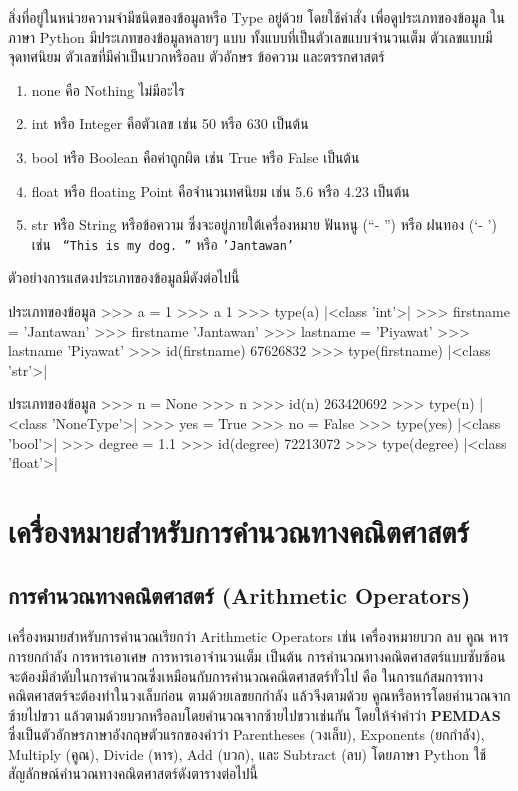 สิ่งที่อยู่ในหน่วยความจำมีชนิดของข้อมูลหรือ Type อยู่ด้วย โดยใช้คำสั่ง  เพื่อดูประเภทของข้อมูล ในภาษา Python มีประเภทของข้อมูลหลายๆ แบบ \cite{Luc15} ทั้งแบบที่เป็นตัวเลขแบบจำนวนเต็ม ตัวเลขแบบมีจุดทศนิยม ตัวเลขที่มีค่าเป็นบวกหรือลบ ตัวอักษร ข้อความ และตรรกศาสตร์

\begin{enumerate}[noitemsep]
\item none คือ Nothing ไม่มีอะไร 
\item int หรือ Integer คือตัวเลข เช่น 50 หรือ 630 เป็นต้น
\item bool หรือ Boolean คือค่าถูกผิด เช่น True หรือ False เป็นต้น
\item float หรือ floating Point คือจำนวนทศนิยม เช่น 5.6 หรือ 4.23 เป็นต้น
\item str หรือ String หรือข้อความ ซึ่งจะอยู่ภายใต้เครื่องหมาย ฟันหนู (\textquotedblleft - \textquotedblright) หรือ ฝนทอง  (\textquoteleft - \textquoteright)   เช่น \texttt{ \textquotedblleft This is my dog. \textquotedblright }  หรือ \texttt{'Jantawan'}
\end{enumerate}

ตัวอย่างการแสดงประเภทของข้อมูลมีดังต่อไปนี้

\begin{codelist}{ประเภทของข้อมูล}{}
>>> a = 1
>>> a
1
>>> type(a)
|<class \rq{}int\rq{}>|
>>> firstname = 'Jantawan'
>>> firstname
'Jantawan'
>>> lastname = 'Piyawat'
>>> lastname
'Piyawat'
>>> id(firstname)
67626832
>>> type(firstname)
|<class \rq{}str\rq{}>|
\end{codelist}


\begin{codelist}{ประเภทของข้อมูล}{}
>>> n = None
>>> n
>>> id(n)
263420692
>>> type(n)
|<class \rq{}NoneType\rq{}>|
>>> yes = True
>>> no = False
>>> type(yes)
|<class \rq{}bool\rq{}>|
>>> degree = 1.1
>>> id(degree)
72213072
>>> type(degree)
|<class \rq{}float\rq{}>|
\end{codelist}


\section{เครื่องหมายสำหรับการคำนวณทางคณิตศาสตร์}
\subsection{การคำนวณทางคณิตศาสตร์ (Arithmetic Operators)}

เครื่องหมายสำหรับการคำนวณเรียกว่า  Arithmetic Operators เช่น เครื่องหมายบวก ลบ คูณ หาร การยกกำลัง การหารเอาเศษ การหารเอาจำนวนเต็ม เป็นต้น การคำนวณทางคณิตศาสตร์แบบซับซ้อนจะต้องมีลำดับในการคำนวณซึ่งเหมือนกับการคำนวณคณิตศาสตร์ทั่วไป คือ ในการแก้สมการทางคณิตศาสตร์จะต้องทำในวงเล็บก่อน ตามด้วยเลขยกกำลัง แล้วจึงตามด้วย คูณหรือหารโดยคำนวณจากซ้ายไปขวา แล้วตามด้วยบวกหรือลบโดยคำนวณจากซ้ายไปขวาเช่นกัน โดยให้จำคำว่า \textbf{PEMDAS} ซึ่งเป็นตัวอักษรภาษาอังกฤษตัวแรกของคำว่า Parentheses (วงเล็บ), Exponents (ยกกำลัง), Multiply (คูณ), Divide (หาร), Add (บวก), และ Subtract (ลบ) โดยภาษา Python  ใช้สัญลักษณ์คำนวณทางคณิตศาสตร์ดังตารางต่อไปนี้  \cite{Bil15}

